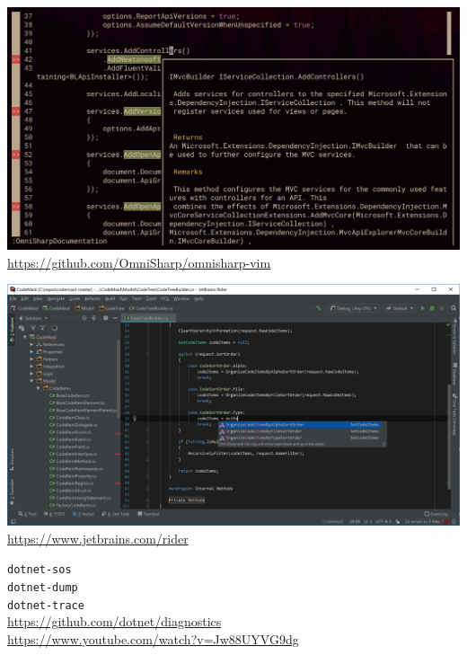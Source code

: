 \documentclass[utf8x]{beamer}
\begin{document}
\begin{frame}
    \centering
    \includegraphics[width=\textwidth]{vim.png}
    \tiny\url{https://github.com/OmniSharp/omnisharp-vim}
\end{frame}

\begin{frame}
    \centering
    \includegraphics[width=\textwidth]{rider.png}
    \tiny\url{https://www.jetbrains.com/rider}
\end{frame}

\begin{frame}
    \begin{center}
        \Large \texttt{dotnet-sos}
        \\
        \Large \texttt{dotnet-dump}
        \\
        \Large \texttt{dotnet-trace}
        \\
        \vspace{10pt}\tiny\url{https://github.com/dotnet/diagnostics}\\
        \tiny\url{https://www.youtube.com/watch?v=Jw88UYVG9dg}
    \end{center}
\end{frame}
\end{document}
